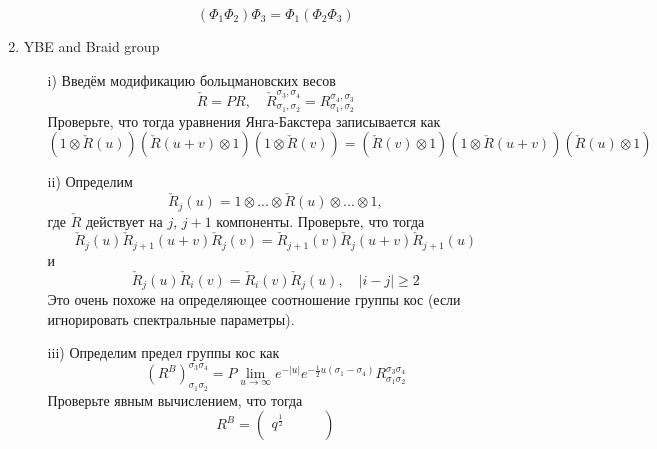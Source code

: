 \documentclass[12pt]{article}
\theoremstyle{definition}
\begin{document}
\begin{enumerate}
\begin{itemize}
        \begin{equation}
            \boxed{(\Phi_1\Phi_2)\Phi_3=\Phi_1(\Phi_2\Phi_3)}
        \end{equation}
    \end{itemize}
    \item YBE and Braid group
    \begin{itemize}
        \item[i)] Введём модификацию больцмановских весов
        \begin{equation}
            \check{R}=PR,\quad \check{R}^{\sigma_3,\sigma_4}_{\sigma_1,\sigma_2}=R^{\sigma_4,\sigma_3}_{\sigma_1,\sigma_2}
        \end{equation}
        Проверьте, что тогда уравнения Янга-Бакстера записывается как
        \begin{equation}
            (1\otimes\check{R}(u))(\check{R}(u+v)\otimes1)(1\otimes\check{R}(v))=(\check{R}(v)\otimes1)(1\otimes\check{R}(u+v))(\check{R}(u)\otimes1)
        \end{equation}
        \item[ii)] Определим
        \begin{equation}
            \check{R}_j(u)=1\otimes...\otimes\check{R}(u)\otimes...\otimes1,
        \end{equation}
        где $\check{R}$ действует на $j$, $j+1$ компоненты. Проверьте, что тогда
        \begin{equation}
            \check{R}_j(u)\check{R}_{j+1}(u+v)\check{R}_j(v)=\check{R}_{j+1}(v)\check{R}_j(u+v)\check{R}_{j+1}(u)
        \end{equation}
        и
        \begin{equation}
            \check{R}_j(u)\check{R}_i(v)=\check{R}_i(v)\check{R}_j(u),\quad|i-j|\geq2
        \end{equation}
        Это очень похоже на определяющее соотношение группы кос (если игнорировать спектральные параметры).
        \item[iii)] Определим предел группы кос как
        \begin{equation}
            (R^B)^{\sigma_3\sigma_4}_{\sigma_1\sigma_2}=P\lim\limits_{u\rightarrow\infty}e^{-|u|}e^{-\frac{1}{2}u(\sigma_1-\sigma_4)}R^{\sigma_3\sigma_4}_{\sigma_1\sigma_2}
        \end{equation}
        Проверьте явным вычислением, что тогда
        \begin{equation}
            R^B=\begin{pmatrix}
                q^\frac{1}{2}&&&\\

\end{pmatrix}
\end{equation}
\end{itemize}
\end{enumerate}
\end{document}
